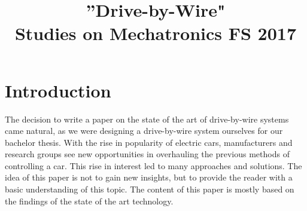 \documentclass[conference]{IEEEtran}
\begin{document}
\title{
''Drive-by-Wire"
\\[0.5cm]
\large{Studies on Mechatronics FS 2017}
}

\author{
\and

}

\maketitle

\setlength\parindent{0pt}
\newcommand{\spn}[1]{\textsc{Span} \left\{ #1 \right\}}
\newcommand{\dimension}[1]{\textsc{dim} \left\{ #1 \right\}}
\newcommand{\real}[1]{\textsc{Re} \left( #1 \right)}
\newcommand{\imag}[1]{\textsc{Im} \left( #1 \right)}
\newcommand{\DET}[1]{\textsc{Det} \left[ #1 \right]}
\newcommand*\rfrac[2]{{}^{#1}\!/_{#2}}


\thispagestyle{plain}
\pagestyle{plain}



\section{Introduction}

The decision to write a paper on the state of the art of drive-by-wire systems came natural, as we were designing a drive-by-wire system ourselves for our bachelor thesis. With the rise in popularity of electric cars, manufacturers and research groups see new opportunities in overhauling the previous methods of controlling a car. This rise in interest led to many approaches and solutions. The idea of this paper is not to gain new insights, but to provide the reader with a basic understanding of this topic. The content of this paper is mostly based on the findings of the state of the art technology.

%
\end{document}
